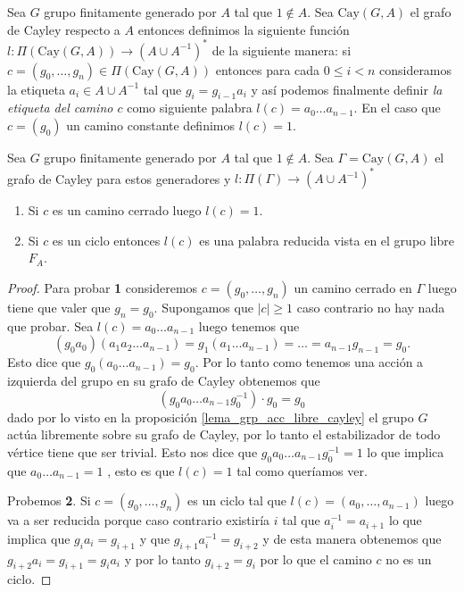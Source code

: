 \documentclass[tesis.tex]{subfiles}
\begin{document}
\begin{deff}
	Sea $G$ grupo finitamente generado por $A$ tal que $1 \notin A$.
	Sea $\text{Cay}(G,A)$ el grafo de Cayley respecto a $A$ entonces definimos la siguiente función 
	$l: \Pi(\text{Cay}(G,A)) \to (A \cup A^{-1})^*$
	de la siguiente manera:
	si $c = (g_{0}, \dots, g_{n}) \in \Pi(\text{Cay}(G,A))$ entonces para cada $0 \le i < n$ consideramos la etiqueta $a_{i} \in A \cup A^{-1}$ tal que $g_{i} = g_{i-1}a_{i}$ y así podemos finalmente definir \emph{la etiqueta del camino $c$} como siguiente palabra 
	$l(c) = a_{0}\dots a_{n-1}$.
	En el caso que $c = (g_{0})$ un camino constante definimos $l(c) = 1$. 
\end{deff}
\begin{lema}\label{obs_grafo_Cayley_palabras}
	Sea $G$ grupo finitamente generado por $A$ tal que $1 \notin A$.
	Sea $\Gamma = \text{Cay}(G,A)$ el grafo de Cayley para estos generadores y $l: \Pi(\Gamma) \to (A \cup A^{-1})^*$ 
	\begin{enumerate}
		\item Si $c$ es un camino cerrado luego $l(c) = 1$.
		
		\item Si $c$ es un ciclo entonces $l(c)$ es una palabra reducida vista en el grupo libre $F_{A}$.
	\end{enumerate}
\end{lema}

\begin{proof}
	Para probar \textbf{1} consideremos $c = (g_{0}, \dots, g_{n})$ un camino cerrado en $\Gamma$ luego tiene que valer que $g_{n} = g_{0}$.
	Supongamos que $|c| \ge 1$ caso contrario no hay nada que probar.
	Sea $l(c) = a_{0} \dots a_{n-1}$ luego tenemos que 
	\[
		(g_{0}a_{0})(a_{1}a_{2} \dots a_{n-1}) = g_{1}(a_{1} \dots a_{n-1}) = \dots = a_{n-1}g_{n-1} =  g_{0}.
	\] 
	Esto dice que $g_{0}(a_{0} \dots a_{n-1}) = g_{0}$.
	Por lo tanto como tenemos una acción a izquierda del grupo en su grafo de Cayley obtenemos que 
	\[
		(g_{0} a_{0} \dots a_{n-1} g_{0}^{-1}) \cdot g_{0} = g_{0}
	\] 
	dado por lo visto en la proposición \ref{lema_grp_acc_libre_cayley} el grupo $G$ actúa libremente sobre su grafo de Cayley, por lo tanto el estabilizador de todo vértice tiene que ser trivial.
	Esto nos dice que 
	$g_{0} a_{0} \dots a_{n-1} g_{0}^{-1}  = 1$ lo que implica que $a_{0} \dots a_{n-1} = 1$ , esto es que $l(c) = 1$ tal como queríamos ver.
	
	Probemos \textbf{2}.
	Si $c = (g_{0}, \dots, g_{n})$ es un ciclo tal que $l(c) = (a_{0}, \dots, a_{n-1})$ luego va a ser reducida porque caso contrario existiría $i$ tal que $a_{i}^{-1} = a_{i+1}$ lo que implica que $g_{i}a_{i} = g_{i+1}$ y que $g_{i+1}a_{i}^{-1} = g_{i+2}$ y de esta manera obtenemos que $g_{i+2}a_{i} = g_{i+1} = g_{i}a_{i}$ y por lo tanto $g_{i+2} = g_{i}$ por lo que el camino $c$ no es un ciclo.
	
\end{proof}
\end{document}
